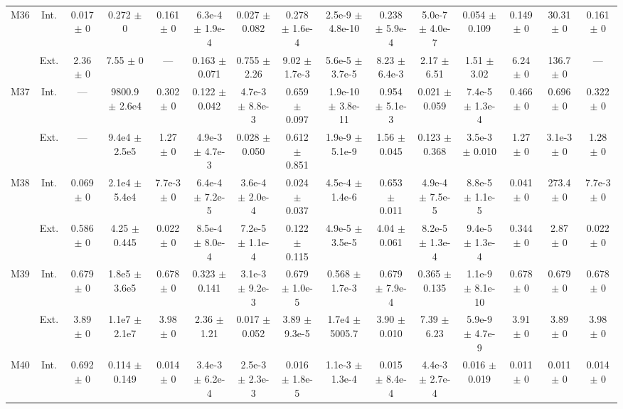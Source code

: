\begin{table}[htbp]
{\begin{tabular}{@{}ccccccccccccccc@{}}
\cline{2-15}
\multirow{2}{*}{M36} & Int. & 0.017 $\pm$ 0 & 0.272 $\pm$ 0 & 0.161 $\pm$ 0 & 6.3e-4 $\pm$ 1.9e-4 & 0.027 $\pm$ 0.082 & 0.278 $\pm$ 1.6e-4 & 2.5e-9 $\pm$ 4.8e-10 & 0.238 $\pm$ 5.9e-4 & 5.0e-7 $\pm$ 4.0e-7 & 0.054 $\pm$ 0.109 & 0.149 $\pm$ 0 & 30.31 $\pm$ 0 & 0.161 $\pm$ 0 \\
 & Ext. & 2.36 $\pm$ 0 & 7.55 $\pm$ 0 & --- & 0.163 $\pm$ 0.071 & 0.755 $\pm$ 2.26 & 9.02 $\pm$ 1.7e-3 & 5.6e-5 $\pm$ 3.7e-5 & 8.23 $\pm$ 6.4e-3 & 2.17 $\pm$ 6.51 & 1.51 $\pm$ 3.02 & 6.24 $\pm$ 0 & 136.7 $\pm$ 0 & --- \\
\cline{2-15}
\multirow{2}{*}{M37} & Int. & --- & 9800.9 $\pm$ 2.6e4 & 0.302 $\pm$ 0 & 0.122 $\pm$ 0.042 & 4.7e-3 $\pm$ 8.8e-3 & 0.659 $\pm$ 0.097 & 1.9e-10 $\pm$ 3.8e-11 & 0.954 $\pm$ 5.1e-3 & 0.021 $\pm$ 0.059 & 7.4e-5 $\pm$ 1.3e-4 & 0.466 $\pm$ 0 & 0.696 $\pm$ 0 & 0.322 $\pm$ 0 \\
 & Ext. & --- & 9.4e4 $\pm$ 2.5e5 & 1.27 $\pm$ 0 & 4.9e-3 $\pm$ 4.7e-3 & 0.028 $\pm$ 0.050 & 0.612 $\pm$ 0.851 & 1.9e-9 $\pm$ 5.1e-9 & 1.56 $\pm$ 0.045 & 0.123 $\pm$ 0.368 & 3.5e-3 $\pm$ 0.010 & 1.27 $\pm$ 0 & 3.1e-3 $\pm$ 0 & 1.28 $\pm$ 0 \\
\cline{2-15}
\multirow{2}{*}{M38} & Int. & 0.069 $\pm$ 0 & 2.1e4 $\pm$ 5.4e4 & 7.7e-3 $\pm$ 0 & 6.4e-4 $\pm$ 7.2e-5 & 3.6e-4 $\pm$ 2.0e-4 & 0.024 $\pm$ 0.037 & 4.5e-4 $\pm$ 1.4e-6 & 0.653 $\pm$ 0.011 & 4.9e-4 $\pm$ 7.5e-5 & 8.8e-5 $\pm$ 1.1e-5 & 0.041 $\pm$ 0 & 273.4 $\pm$ 0 & 7.7e-3 $\pm$ 0 \\
 & Ext. & 0.586 $\pm$ 0 & 4.25 $\pm$ 0.445 & 0.022 $\pm$ 0 & 8.5e-4 $\pm$ 8.0e-4 & 7.2e-5 $\pm$ 1.1e-4 & 0.122 $\pm$ 0.115 & 4.9e-5 $\pm$ 3.5e-5 & 4.04 $\pm$ 0.061 & 8.2e-5 $\pm$ 1.3e-4 & 9.4e-5 $\pm$ 1.3e-4 & 0.344 $\pm$ 0 & 2.87 $\pm$ 0 & 0.022 $\pm$ 0 \\
\cline{2-15}
\multirow{2}{*}{M39} & Int. & 0.679 $\pm$ 0 & 1.8e5 $\pm$ 3.6e5 & 0.678 $\pm$ 0 & 0.323 $\pm$ 0.141 & 3.1e-3 $\pm$ 9.2e-3 & 0.679 $\pm$ 1.0e-5 & 0.568 $\pm$ 1.7e-3 & 0.679 $\pm$ 7.9e-4 & 0.365 $\pm$ 0.135 & 1.1e-9 $\pm$ 8.1e-10 & 0.678 $\pm$ 0 & 0.679 $\pm$ 0 & 0.678 $\pm$ 0 \\
 & Ext. & 3.89 $\pm$ 0 & 1.1e7 $\pm$ 2.1e7 & 3.98 $\pm$ 0 & 2.36 $\pm$ 1.21 & 0.017 $\pm$ 0.052 & 3.89 $\pm$ 9.3e-5 & 1.7e4 $\pm$ 5005.7 & 3.90 $\pm$ 0.010 & 7.39 $\pm$ 6.23 & 5.9e-9 $\pm$ 4.7e-9 & 3.91 $\pm$ 0 & 3.89 $\pm$ 0 & 3.98 $\pm$ 0 \\
\cline{2-15}
\multirow{2}{*}{M40} & Int. & 0.692 $\pm$ 0 & 0.114 $\pm$ 0.149 & 0.014 $\pm$ 0 & 3.4e-3 $\pm$ 6.2e-4 & 2.5e-3 $\pm$ 2.3e-3 & 0.016 $\pm$ 1.8e-5 & 1.1e-3 $\pm$ 1.3e-4 & 0.015 $\pm$ 8.4e-4 & 4.4e-3 $\pm$ 2.7e-4 & 0.016 $\pm$ 0.019 & 0.011 $\pm$ 0 & 0.011 $\pm$ 0 & 0.014 $\pm$ 0 \\

\end{tabular}}
\end{table}
